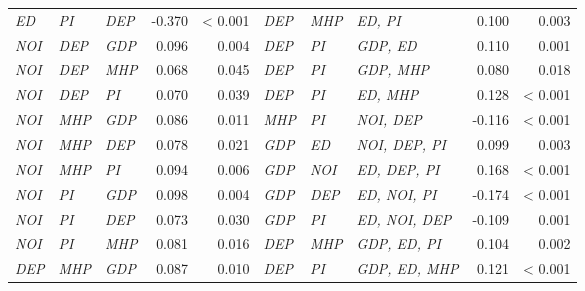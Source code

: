 \begin{tabular}{lllrr|lllrr}
\textit{ED} & \textit{PI} & \textit{DEP} & -0.370 & \textless{} 0.001 & \textit{DEP} & \textit{MHP} & \textit{ED, PI} & 0.100 & 0.003 \\
\textit{NOI} & \textit{DEP} & \textit{GDP} & 0.096 & 0.004 & \textit{DEP} & \textit{PI} & \textit{GDP, ED} & 0.110 & 0.001 \\
\textit{NOI} & \textit{DEP} & \textit{MHP} & 0.068 & 0.045 & \textit{DEP} & \textit{PI} & \textit{GDP, MHP} & 0.080 & 0.018 \\
\textit{NOI} & \textit{DEP} & \textit{PI} & 0.070 & 0.039 & \textit{DEP} & \textit{PI} & \textit{ED, MHP} & 0.128 & \textless{} 0.001 \\
\textit{NOI} & \textit{MHP} & \textit{GDP} & 0.086 & 0.011 & \textit{MHP} & \textit{PI} & \textit{NOI, DEP} & -0.116 & \textless{} 0.001 \\
\textit{NOI} & \textit{MHP} & \textit{DEP} & 0.078 & 0.021 & \textit{GDP} & \textit{ED} & \textit{NOI, DEP, PI} & 0.099 & 0.003 \\
\textit{NOI} & \textit{MHP} & \textit{PI} & 0.094 & 0.006 & \textit{GDP} & \textit{NOI} & \textit{ED, DEP, PI} & 0.168 & \textless{} 0.001 \\
\textit{NOI} & \textit{PI} & \textit{GDP} & 0.098 & 0.004 & \textit{GDP} & \textit{DEP} & \textit{ED, NOI, PI} & -0.174 & \textless{} 0.001 \\
\textit{NOI} & \textit{PI} & \textit{DEP} & 0.073 & 0.030 & \textit{GDP} & \textit{PI} & \textit{ED, NOI, DEP} & -0.109 & 0.001 \\
\textit{NOI} & \textit{PI} & \textit{MHP} & 0.081 & 0.016 & \textit{DEP} & \textit{MHP} & \textit{GDP, ED, PI} & 0.104 & 0.002 \\
\textit{DEP} & \textit{MHP} & \textit{GDP} & 0.087 & 0.010 & \textit{DEP} & \textit{PI} & \textit{GDP, ED, MHP} & 0.121 & \textless{} 0.001 \\
\bottomrule
\end{tabular}
